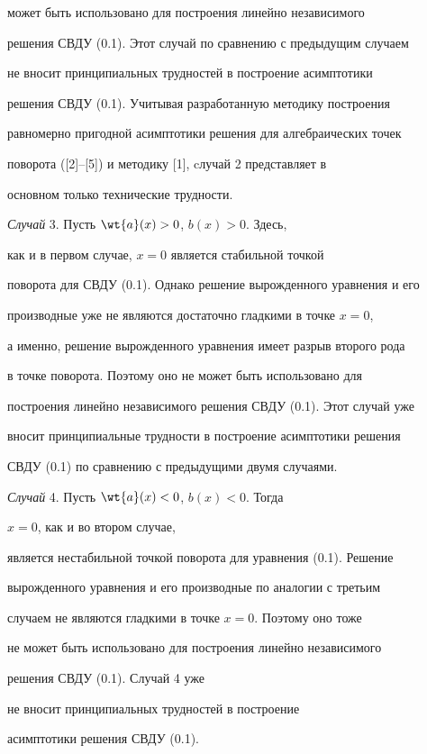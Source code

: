 может быть использовано для построения линейно независимого


решения СВДУ (0.1). Этот случай по сравнению с предыдущим случаем


не вносит принципиальных трудностей в построение асимптотики


решения СВДУ (0.1). Учитывая разработанную методику построения


равномерно пригодной асимптотики решения для алгебраических точек


поворота ([2]--[5]) и методику [1], cлучай 2 представляет в


основном только технические трудности.





{\it Случай} 3. Пусть $\wt{a}(x) > 0$, $b (x) > 0$. Здесь,


как и в первом случае, $x = 0$ является стабильной точкой


поворота для СВДУ (0.1). Однако решение вырожденного уравнения и его


производные уже не являются достаточно гладкими в точке $x = 0$,


а именно, решение вырожденного уравнения имеет разрыв второго рода


в точке поворота. Поэтому оно не может быть использовано для


построения линейно независимого решения СВДУ (0.1). Этот случай уже


вносит принципиальные трудности в построение асимптотики решения


СВДУ (0.1) по сравнению с предыдущими двумя случаями.





{\it Случай} 4. Пусть $\wt{a}(x) < 0$, $b (x) < 0$. Тогда


$x=0$, как и во втором случае,


является нестабильной точкой поворота для уравнения (0.1). Решение


вырожденного уравнения и его производные по аналогии с третьим


случаем не являются гладкими в точке $ x = 0$. Поэтому оно тоже


не может быть использовано для построения линейно независимого


решения СВДУ (0.1). Случай 4 уже


не вносит принципиальных трудностей в построение


асимптотики решения СВДУ (0.1).





